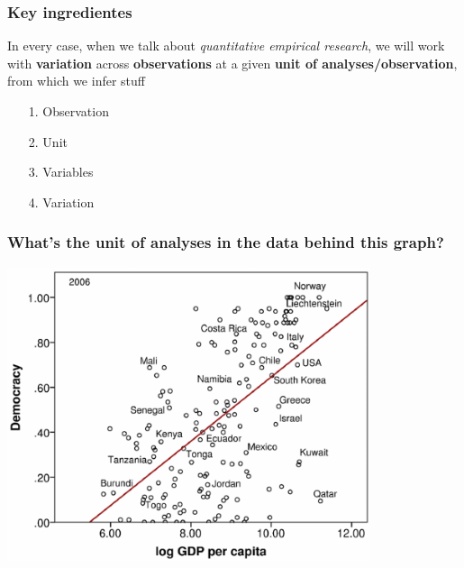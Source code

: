 \documentclass[aspectratio=43]{beamer}
\begin{document}
\begin{frame}
\frametitle{Key ingredientes}
\centering

\begin{flushleft}
In every case, when we talk about \textit{quantitative empirical research}, we will work with \textbf{variation} across \textbf{observations} at a given \textbf{unit of analyses/observation}, from which we infer stuff
\end{flushleft}


\vspace{10pt}

\begin{itemize}[<+->]
  \item[1.] Observation
  \item[2.] Unit
  \item[3.] Variables
  \item[4.] Variation
\end{itemize}

\end{frame}

\begin{frame}
\frametitle{What's the unit of analyses in the data behind this graph?}
\centering

\includegraphics[width = 0.8\textwidth]{../img/ua1}

\end{frame}

\end{document}
